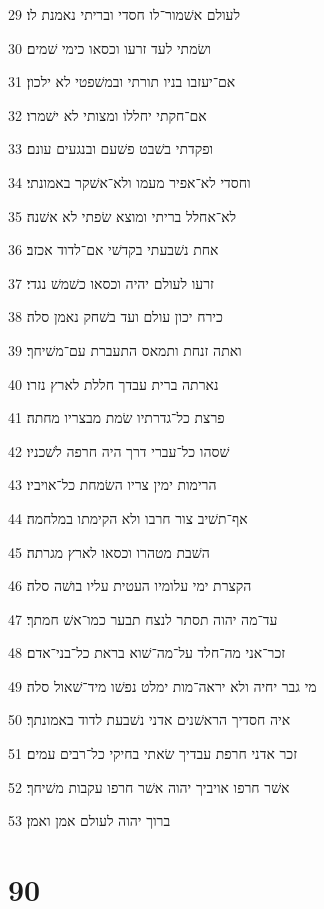 \par 29 לעולם אשׁמור־לו חסדי ובריתי נאמנת לו׃
\par 30 ושׂמתי לעד זרעו וכסאו כימי שׁמים׃
\par 31 אם־יעזבו בניו תורתי ובמשׁפטי לא ילכון׃
\par 32 אם־חקתי יחללו ומצותי לא ישׁמרו׃
\par 33 ופקדתי בשׁבט פשׁעם ובנגעים עונם׃
\par 34 וחסדי לא־אפיר מעמו ולא־אשׁקר באמונתי׃
\par 35 לא־אחלל בריתי ומוצא שׂפתי לא אשׁנה׃
\par 36 אחת נשׁבעתי בקדשׁי אם־לדוד אכזב׃
\par 37 זרעו לעולם יהיה וכסאו כשׁמשׁ נגדי׃
\par 38 כירח יכון עולם ועד בשׁחק נאמן סלה׃
\par 39 ואתה זנחת ותמאס התעברת עם־משׁיחך׃
\par 40 נארתה ברית עבדך חללת לארץ נזרו׃
\par 41 פרצת כל־גדרתיו שׂמת מבצריו מחתה׃
\par 42 שׁסהו כל־עברי דרך היה חרפה לשׁכניו׃
\par 43 הרימות ימין צריו השׂמחת כל־אויביו׃
\par 44 אף־תשׁיב צור חרבו ולא הקימתו במלחמה׃
\par 45 השׁבת מטהרו וכסאו לארץ מגרתה׃
\par 46 הקצרת ימי עלומיו העטית עליו בושׁה סלה׃
\par 47 עד־מה יהוה תסתר לנצח תבער כמו־אשׁ חמתך׃
\par 48 זכר־אני מה־חלד על־מה־שׁוא בראת כל־בני־אדם׃
\par 49 מי גבר יחיה ולא יראה־מות ימלט נפשׁו מיד־שׁאול סלה׃
\par 50 איה חסדיך הראשׁנים אדני נשׁבעת לדוד באמונתך׃
\par 51 זכר אדני חרפת עבדיך שׂאתי בחיקי כל־רבים עמים׃
\par 52 אשׁר חרפו אויביך יהוה אשׁר חרפו עקבות משׁיחך׃
\par 53 ברוך יהוה לעולם אמן ואמן׃

\chapter{90}

